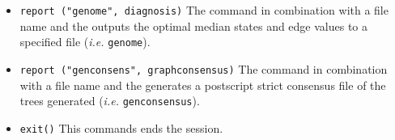\begin{itemize}
\item \texttt{report ("genome", diagnosis)}  The  command in combination with a file name and the  outputs the optimal median states and edge values to a specified file (\emph{i.e.} \texttt{genome}). 
\item \texttt{report ("genconsens", graphconsensus)}  The  command in combination with a file name and the  generates a postscript strict consensus file of the trees generated (\emph{i.e.} \texttt{genconsensus}). 
\item \texttt{exit()} This commands ends the \poy session.
\end{itemize}